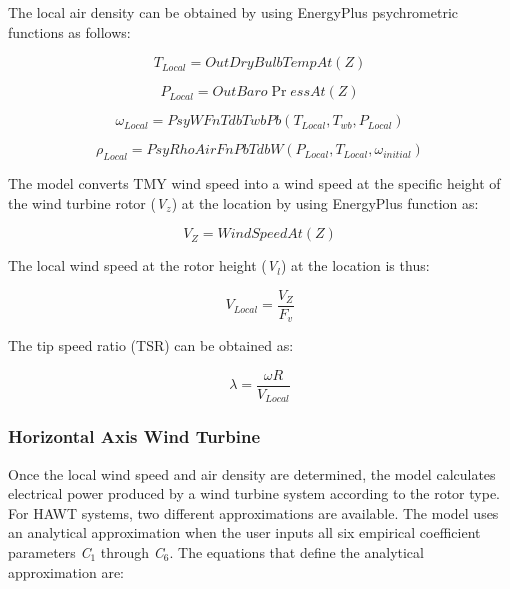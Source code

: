 The local air density can be obtained by using EnergyPlus psychrometric functions as follows:

\begin{equation}
{T_{Local}} = OutDryBulbTempAt(Z)
\end{equation}

\begin{equation}
{P_{Local}} = OutBaro\Pr essAt(Z)
\end{equation}

\begin{equation}
{\omega_{Local}} = PsyWFnTdbTwbPb({T_{Local}},{T_{wb}},{P_{Local}})
\end{equation}

\begin{equation}
{\rho_{Local}} = PsyRhoAirFnPbTdbW({P_{Local}},{T_{Local}},{\omega_{initial}})
\end{equation}

The model converts TMY wind speed into a wind speed at the specific height of the wind turbine rotor (\emph{V\(_{z}\)}) at the location by using EnergyPlus function as:

\begin{equation}
{V_Z} = WindSpeedAt(Z)
\end{equation}

The local wind speed at the rotor height (\emph{V\(_{l}\)}) at the location is thus:

\begin{equation}
{V_{Local}} = \frac{{{V_Z}}}{{{F_v}}}
\end{equation}

The tip speed ratio (TSR) can be obtained as:

\begin{equation}
\lambda  = \frac{{\omega R}}{{{V_{Local}}}}
\end{equation}

\subsubsection{Horizontal Axis Wind Turbine}\label{horizontal-axis-wind-turbine}

Once the local wind speed and air density are determined, the model calculates electrical power produced by a wind turbine system according to the rotor type. For HAWT systems, two different approximations are available. The model uses an analytical approximation when the user inputs all six empirical coefficient parameters \emph{C\(_{1}\)} through \emph{C\(_{6}\)}. The equations that define the analytical approximation are:

